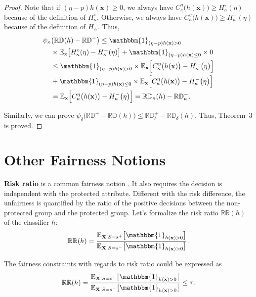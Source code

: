 \documentclass[letterpaper]{article} %
\newcommand{\X}{\mathbf{X}}
\newcommand{\x}{\mathbf{x}}
\newcommand{\E}{\mathbb{E}}
\newcommand{\I}{\mathbbm{1}}
\newcommand{\RD}{\mathbb{RD}}
\newcommand{\crd}{C^{\eta}}
\begin{document}
\begin{proof}
	Note that if $ ( \eta - p )  h(\x) \geq 0 $, we always have $ \crd_{\kappa} \big( h(\x) \big) \geq H^{\circ}_{\kappa} ( \eta ) $ because of the definition of $H^{\circ}_{\kappa}$. Otherwise, we always have $ \crd_{\kappa} \big( h( \x ) \big) \geq H^{-}_{\kappa} ( \eta ) $ because of the definition of $H^{-}_{\phi}$. Thus,
	\begin{align*}
		\psi_{\kappa} & \big( \RD (h)  - \RD^- \big)  \leq \I_{( \eta - p )  h(\x) > 0}                                                                                  \\
		                            & \times \E_\x \big[ H^{\circ}_{\kappa} ( \eta ) - H^{-}_{\kappa} ( \eta ) \big] +  \I_{( \eta - p )  h(\x) \leq 0} \times   0      \\
		                            & \leq \I_{( \eta - p )  h(\x) > 0}  \times \E_\x  \Big[ \crd_{\kappa} \big( h( \x )\big)  - H^{-}_{\kappa} \big( \eta \big) \Big]  \\
		                            & + \I_{( \eta - p )  h(\x) \leq 0} \times   \E_\x  \Big[ \crd_{\kappa} \big( h( \x )\big)  - H^{-}_{\kappa} \big( \eta \big) \Big] \\
		                            & = \E_\x  \Big[ \crd_{\kappa} \big( h( \x )\big)  - H^{-}_{\kappa} \big( \eta \big) \Big]   = \RD_{\kappa} (h) - \RD^{-}_{\kappa}.
	\end{align*}

	Similarly, we can prove $ \psi_{\delta} \big( \RD^+ - \RD (h) \big)  \leq \RD^{+}_{\delta} - \RD_{\delta} (h)$.
	Thus, Theorem~3 is proved.
\end{proof}

\section{Other Fairness Notions}

\textbf{Risk ratio} is a common fairness notion \cite{Pedreschi,Romei2013}. It also requires the decision is independent with the protected attribute. Different with the risk difference, the unfairness is quantified by the ratio of the positive decisions between the non-protected group and the protected group.  Let's formalize the risk ratio $\mathbb{RR}(h)$ of the classifier $h$:
\[ \mathbb{RR} (h) = \frac{ \E_{\X|S=s^+} \big[ \I_{h(\x) > 0}\big] }{ \E_{\X|S=s^-} \big[ \I_{h(\x) > 0}\big] } . \]

The fairness constraints with regards to risk ratio could be expressed as
\[ \mathbb{RR} (h) = \frac{ \E_{\X|S=s^+} \big[ \I_{h(\x) > 0}\big] }{ \E_{\X|S=s^-} \big[ \I_{h(\x) > 0}\big] } \leq \tau. \]
\end{document}
